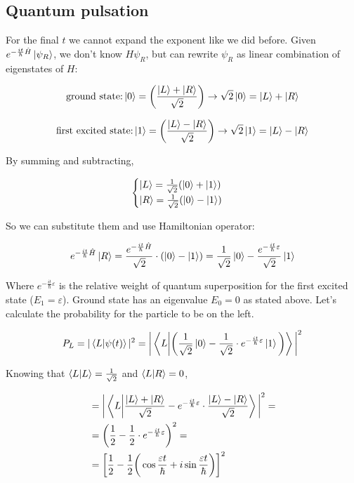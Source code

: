 	\subsection{Quantum pulsation}
For the final $t$ we cannot expand the exponent like we did before.
Given $e^{-\frac{it}{\hbar}\hat{H}}\ket{\psi_R}$, we don't know $H\psi_R$, but can rewrite $\psi_R$ as linear combination of eigenstates of $H$:

$$\text{ground state:} \ket{0}=\bigg(\frac{\ket{L}+\ket{R}}{\sqrt{2}}\bigg) \rightarrow \sqrt{2}\ket{0}= \ket{L}+\ket{R}$$

$$\text{first excited state:} \ket{1}=\bigg(\frac{\ket{L}-\ket{R}}{\sqrt{2}}\bigg) \rightarrow \sqrt{2}\ket{1}= \ket{L}-\ket{R}$$

By summing and subtracting,

$$\begin{cases}\ket{L}=\frac{1}{\sqrt{2}}(\ket{0}+\ket{1})\\\ket{R}=\frac{1}{\sqrt{2}}(\ket{0}-\ket{1})\end{cases}$$

So we can substitute them and use Hamiltonian operator:

$$e^{-\frac{it}{\hbar}\hat{H}}\ket{R}=\frac{e^{-\frac{it}{\hbar}\hat{H}}}{\sqrt{2}}\cdot (\ket{0}-\ket{1})=\frac{1}{\sqrt{2}}\ket{0}-\frac{e^{-\frac{it}{\hbar}\varepsilon}}{\sqrt{2}}\ket{1}$$

Where $e^{-\frac{it}{\hbar}\varepsilon}$ is the relative weight of quantum superposition for the first excited state ($E_1=\varepsilon$).
Ground state has an eigenvalue $E_0=0$ as stated above.
Let's calculate the probability for the particle to be on the left.

$$P_L=|\braket{L}{\psi(t)}|^2=\bigg|\braket{L}{\bigg(\frac{1}{\sqrt{2}}\ket{0}-\frac{1}{\sqrt{2}}\cdot e^{-\frac{it}{\hbar}\varepsilon} \ket{1} \bigg)}\bigg|^2$$

Knowing that $\braket{L}{L}=\frac{1}{\sqrt{2}}$ and $\braket{L}{R}=0$,

\begin{align*}
	&=\bigg|\braket{L}{\frac{\ket{L}+\ket{R}}{\sqrt{2}}-e^{-\frac{it}{\hbar}\varepsilon}\cdot\frac{\ket{L}-\ket{R}}{\sqrt{2}}}\bigg|^2=\\
	&=\bigg(\frac{1}{2}-\frac{1}{2}\cdot e^{-\frac{it}{\hbar}\varepsilon}\bigg)^2=\\
	&=\bigg[\frac{1}{2}-\frac{1}{2}\bigg(\cos\frac{\varepsilon t}{\hbar}+i\sin\frac{\varepsilon t}{\hbar}\bigg)\bigg]^2
\end{align*}


